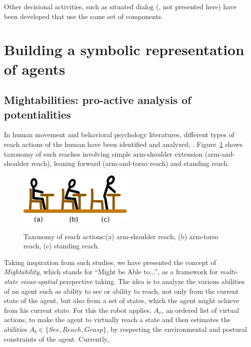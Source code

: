 \documentclass{svmult}
\begin{document}
Other decisional activities, such as situated dialog (\cite{Ros2010b,
  Lemaignan2011}, not presented here) have been developed that use the
same set of components.





\section{Building a symbolic representation of agents}
\label{grounding_agents}


\subsection{Mightabilities: pro-active analysis of potentialities}


In human movement and behavioral psychology literatures, different types of
reach actions of the human have been identified and analyzed,
\cite{Gardner2001, Choi2004}.  Figure~\ref{fig|reaches_taxonomy} shows taxonomy
of such reaches involving simple arm-shoulder extension (arm-and-shoulder
reach), leaning forward (arm-and-torso reach) and standing reach.

\begin{figure}
  \centering
  \includegraphics[width=0.5\textwidth]{./figs/reach_postures.pdf} \\
  \caption {Taxonomy of reach actions:(a) arm-shoulder reach, (b) arm-torso 
  reach, (c) standing reach.}
  \label{fig|reaches_taxonomy}
\end{figure}

Taking inspiration from such studies, we have presented the concept of
\emph{Mightability}, which stands for ``Might be Able to...'', as a framework for
\emph{multi-state visuo-spatial} perspective taking. The idea is to analyze the
various abilities of an agent such as ability to see or ability to reach, not
only from the current state of the agent, but also from a set of states, which
the agent might achieve from his current state. For this the robot applies, $A_v$,
an ordered list of virtual actions, to make the agent to virtually reach a state
and then estimates the abilities $A_b \in \{See, Reach, Grasp\}$, by respecting the
environmental and postural constraints of the agent. Currently,
\end{document}
